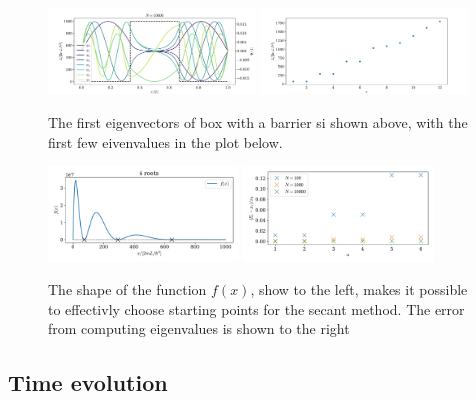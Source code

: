 \documentclass{article}
\begin{document}
    \begin{figure}[ht]
        \centering
        \includegraphics[width=0.49\textwidth]{box_w_barrier/eigenvecs}
        \includegraphics[width=0.49\textwidth]{box_w_barrier/eigenvals}
        \caption{The first eigenvectors of box with a barrier si shown above, with the first few eivenvalues in the plot below.}
        \label{fig:eigenvecs box w barrier}
    \end{figure}

    \begin{figure}[ht]
        \centering
        \includegraphics[width=0.45\textwidth]{box_w_barrier/roots.pdf}
        \includegraphics[width=0.45\textwidth]{box_w_barrier/roots_error.pdf}
        \caption{The shape of the function $f(x)$, show to the left, makes it possible to effectivly choose starting points for the secant method. The error from computing eigenvalues is shown to the right}
        \label{fig:eigenvals box w barrier}
    \end{figure}

\subsection*{Time evolution}
\end{document}

